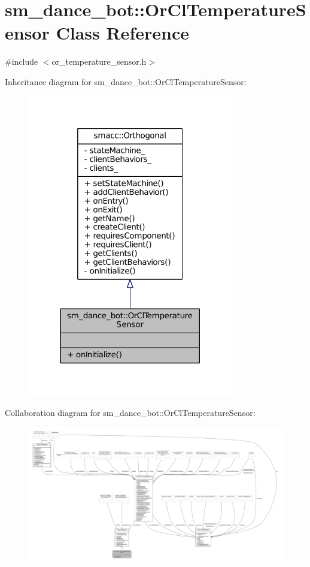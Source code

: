 \hypertarget{classsm__dance__bot_1_1OrClTemperatureSensor}{}\section{sm\+\_\+dance\+\_\+bot\+:\+:Or\+Cl\+Temperature\+Sensor Class Reference}
\label{classsm__dance__bot_1_1OrClTemperatureSensor}


{\ttfamily \#include $<$or\+\_\+temperature\+\_\+sensor.\+h$>$}



Inheritance diagram for sm\+\_\+dance\+\_\+bot\+:\+:Or\+Cl\+Temperature\+Sensor\+:
\nopagebreak
\begin{figure}[H]
\begin{center}
\leavevmode
\includegraphics[width=254pt]{classsm__dance__bot_1_1OrClTemperatureSensor__inherit__graph}
\end{center}
\end{figure}


Collaboration diagram for sm\+\_\+dance\+\_\+bot\+:\+:Or\+Cl\+Temperature\+Sensor\+:
\nopagebreak
\begin{figure}[H]
\begin{center}
\leavevmode
\includegraphics[width=350pt]{classsm__dance__bot_1_1OrClTemperatureSensor__coll__graph}
\end{center}
\end{figure}
